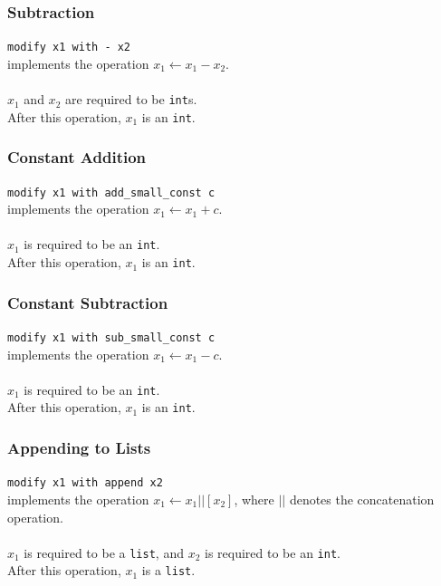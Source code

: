 \documentclass[11pt]{report}
\begin{document}
\subsubsection{Subtraction}

\texttt{modify x1 with - x2} \\
implements the operation $x_1 \leftarrow x_1 - x_2$. \\ \\
$x_1$ and $x_2$ are required to be \texttt{int}s. \\
After this operation, $x_1$ is an \texttt{int}.

\subsubsection{Constant Addition}

\texttt{modify x1 with add\_small\_const c} \\
implements the operation $x_1 \leftarrow x_1 + c$. \\ \\
$x_1$ is required to be an \texttt{int}. \\
After this operation, $x_1$ is an \texttt{int}.

\subsubsection{Constant Subtraction}

\texttt{modify x1 with sub\_small\_const c} \\
implements the operation $x_1 \leftarrow x_1 - c$. \\ \\
$x_1$ is required to be an \texttt{int}. \\
After this operation, $x_1$ is an \texttt{int}.

\subsubsection{Appending to Lists}

\texttt{modify x1 with append x2} \\
implements the operation $x_1 \leftarrow x_1 || [x_2]$, where $||$ denotes the concatenation operation. \\ \\
$x_1$ is required to be a \texttt{list}, and $x_2$ is required to be an \texttt{int}. \\
After this operation, $x_1$ is a \texttt{list}.
\end{document}
